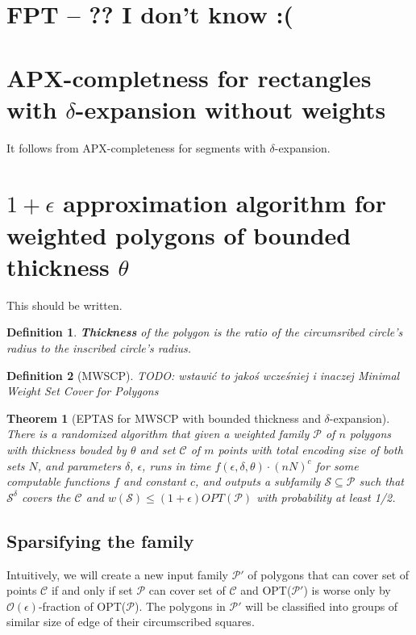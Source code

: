 \documentclass[en]{pracamgr}
\newtheorem{defi}{Definition}[section]
\newtheorem{tw}{Theorem}[section]
\begin{document}
\section{FPT -- ?? I don't know :(}

\section{APX-completness for rectangles with $\delta$-expansion without weights}
It follows from APX-completeness for segments with $\delta$-expansion.
\section{$1+\epsilon$ approximation algorithm for weighted polygons of bounded thickness $\theta$}
This should be written.

\begin{defi}
  \textbf{Thickness} of the polygon
  is the ratio of the circumsribed circle's
  radius to the inscribed circle's radius.
\end{defi}

\begin{defi}[MWSCP]
	TODO: wstawić to jakoś wcześniej i inaczej
	Minimal Weight Set Cover for Polygons
\end{defi}

\begin{tw}[EPTAS for MWSCP with bounded thickness and $\delta$-expansion]
There is a randomized algorithm that given
a weighted family $\mathcal{P}$ of $n$ polygons
with thickness bouded by $\theta$
and set $\mathcal{C}$ of $m$ points
with total encoding
size of both sets $N$, and parameters $\delta$, $\epsilon$,
runs in time $f(\epsilon, \delta, \theta) \cdot (nN)^c$
for some computable functions $f$ and constant $c$,
and outputs a subfamily $\mathcal{S} \subseteq \mathcal{P}$
such that $\mathcal{S}^{\delta}$
covers the $\mathcal{C}$
and $w(\mathcal{S}) \le (1+\epsilon)OPT(\mathcal{P})$
with probability at least 1/2.
\end{tw}

\subsection{Sparsifying the family}
Intuitively, we will create a new input family
$\mathcal{P'}$ of polygons that 
can cover set of points $\mathcal{C}$
if and only if set $\mathcal{P}$
can cover set of $\mathcal{C}$
and OPT($\mathcal{P'}$)
is worse only by $\mathcal{O}(\epsilon)$-fraction of OPT($\mathcal{P}$).
The polygons in $\mathcal{P'}$ will be classified
into groups of similar size of edge of their
circumscribed squares.
\end{document}
